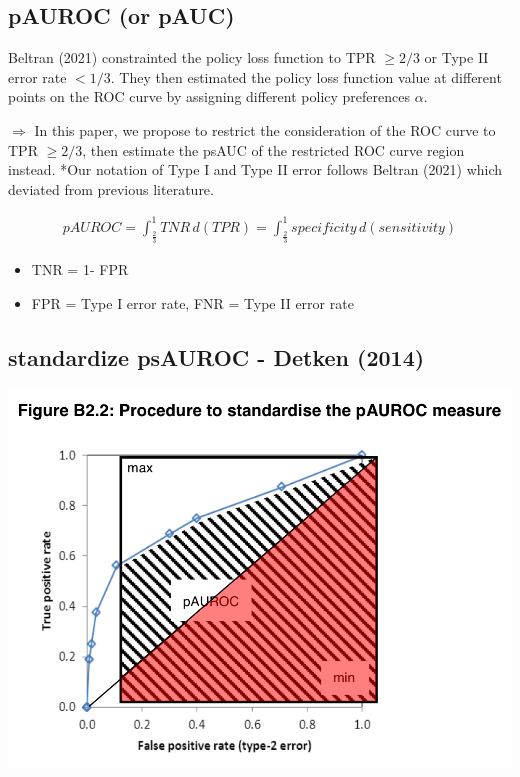 \documentclass[
  12pt,
]{article}
\providecommand{\tightlist}{%
  \setlength{\itemsep}{0pt}\setlength{\parskip}{0pt}}
\begin{document}
\hypertarget{pauroc-or-pauc}{%
\subsection{pAUROC (or pAUC)}\label{pauroc-or-pauc}}

Beltran (2021) constrainted the policy loss function to TPR \(\ge 2/3\) or Type II error rate \(< 1/3\). They then estimated the policy loss function value at different points on the ROC curve by assigning different policy preferences \(\alpha\).

\(\Rightarrow\) In this paper, we propose to restrict the consideration of the ROC curve to TPR \(\ge 2/3\), then estimate the psAUC of the restricted ROC curve region instead. *Our notation of Type I and Type II error follows Beltran (2021) which deviated from previous literature.

\begin{align}
pAUROC = \int_{\frac{2}{3}}^1 TNR \, d(TPR) = \int_{\frac{2}{3}}^1 specificity \, d(sensitivity)
\end{align}

\begin{itemize}
\tightlist
\item
  TNR = 1- FPR
\item
  FPR = Type I error rate, FNR = Type II error rate
\end{itemize}

\hypertarget{standardize-psauroc---detken-2014}{%
\subsection{standardize psAUROC - Detken (2014)}\label{standardize-psauroc---detken-2014}}

\begin{center}\includegraphics[width=0.7\linewidth]{../metadata/pAUC} \end{center}
\end{document}
